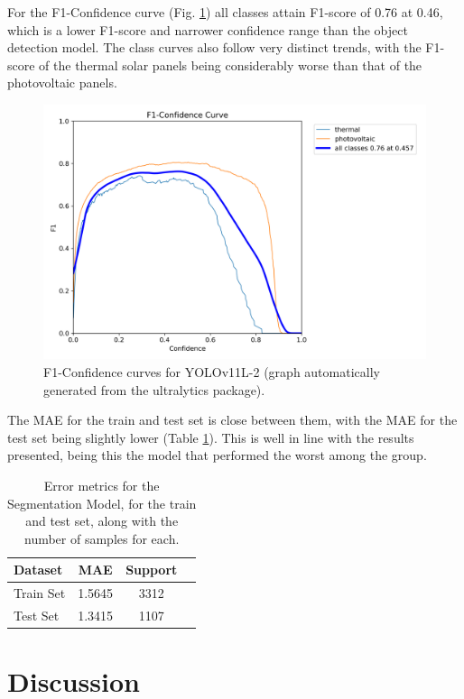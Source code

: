 \documentclass[conference]{IEEEtran}
\begin{document}
For the F1-Confidence curve (Fig. \ref{fig:model02_yolof1}) all classes attain F1-score of 0.76 at 0.46, which is a lower F1-score and narrower confidence range than the object detection model. The class curves also follow very distinct trends, with the F1-score of the thermal solar panels being considerably worse than that of the photovoltaic panels.

\begin{figure}[H]
    \centering
    \includegraphics[width=1\linewidth]{assets/model02_yolof1.png}
    \caption{F1-Confidence curves for YOLOv11L-2 (graph automatically generated from the ultralytics package).}
    \label{fig:model02_yolof1}
\end{figure}

The MAE for the train and test set is close between them, with the MAE for the test set being slightly lower (Table \ref{tab:model02_results}). This is well in line with the results presented, being this the model that performed the worst among the group.

\begin{table}[H]
\centering
\caption{Error metrics for the Segmentation Model, for the train and test set, along with the number of samples for each.}
\label{tab:model02_results}
\begin{tabular}{lccc}
\toprule
\textbf{Dataset} & \textbf{MAE} & \textbf{Support} \\
\midrule
Train Set & 1.5645 & 3312 \\
Test Set & 1.3415 & 1107 \\
\bottomrule
\end{tabular}
\end{table}


\section{Discussion}
\end{document}
